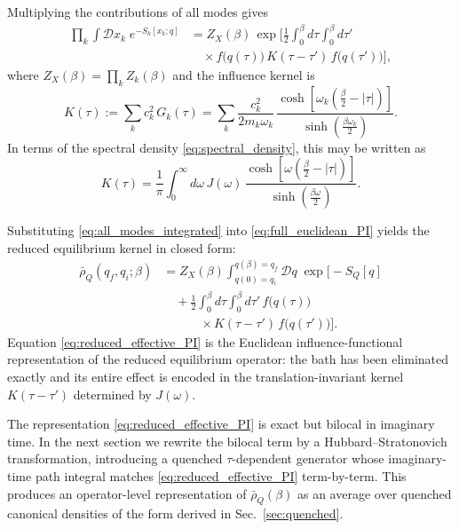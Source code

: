 Multiplying the contributions of all modes gives
\begin{equation}
\begin{split}
    \prod_k \int \mathcal D x_k\; e^{-S_k[x_k;q]}
    &=
    Z_X(\beta)\,
    \exp\Bigg[
        \frac{1}{2}\int_0^\beta d\tau\int_0^\beta d\tau'\, \\
    &\quad \times
        f\!\big(q(\tau)\big)\,K(\tau-\tau')\,f\!\big(q(\tau')\big)
    \Bigg],
\end{split}
    \label{eq:all_modes_integrated}
\end{equation}
where $Z_X(\beta)=\prod_k Z_k(\beta)$ and the influence kernel is
\begin{equation}
    K(\tau)
    :=
    \sum_k c_k^2\,G_k(\tau)
    =
    \sum_k \frac{c_k^2}{2m_k\omega_k}\,
    \frac{\cosh\!\left[\omega_k\left(\frac{\beta}{2}-|\tau|\right)\right]}
         {\sinh\!\left(\frac{\beta\omega_k}{2}\right)}.
    \label{eq:kernel_modesum}
\end{equation}
In terms of the spectral density \eqref{eq:spectral_density}, this may be written as
\begin{equation}
    K(\tau)
    =
    \frac{1}{\pi}\int_0^\infty d\omega\,
    J(\omega)\,
    \frac{\cosh\!\left[\omega\left(\frac{\beta}{2}-|\tau|\right)\right]}
         {\sinh\!\left(\frac{\beta\omega}{2}\right)}.
    \label{eq:kernel_spectral}
\end{equation}

Substituting \eqref{eq:all_modes_integrated} into \eqref{eq:full_euclidean_PI} yields the
reduced equilibrium kernel in closed form:
\begin{equation}
\begin{split}
    \bar\rho_Q(q_f,q_i;\beta)
    &=
    Z_X(\beta)\!
    \int_{q(0)=q_i}^{q(\beta)=q_f}\!\!\mathcal D q\; \exp\Bigg[
        -S_Q[q] \\
        &\quad
        +\frac{1}{2}\int_0^\beta d\tau\int_0^\beta d\tau'\,
        f\!\big(q(\tau)\big) \\
        &\qquad\quad \times K(\tau-\tau')\,f\!\big(q(\tau')\big)
    \Bigg].
\end{split}
    \label{eq:reduced_effective_PI}
\end{equation}
Equation \eqref{eq:reduced_effective_PI} is the Euclidean influence-functional representation
of the reduced equilibrium operator: the bath has been eliminated exactly and its entire
effect is encoded in the translation-invariant kernel $K(\tau-\tau')$ determined by $J(\omega)$.

The representation \eqref{eq:reduced_effective_PI} is exact but bilocal in imaginary time.
In the next section we rewrite the bilocal term by a Hubbard--Stratonovich transformation,
introducing a quenched $\tau$-dependent generator whose imaginary-time path integral matches
\eqref{eq:reduced_effective_PI} term-by-term. This produces an operator-level representation
of $\bar\rho_Q(\beta)$ as an average over quenched canonical densities of the form derived in
Sec.~\ref{sec:quenched}.
